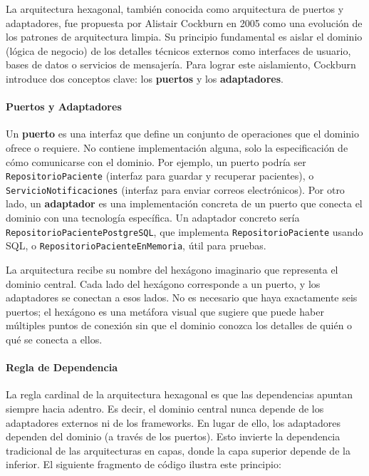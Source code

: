La arquitectura hexagonal, también conocida como arquitectura de puertos y adaptadores, 
fue propuesta por Alistair Cockburn en 2005 como una evolución de los patrones de arquitectura 
limpia\cite{hexagonalCockburn}. Su principio fundamental es aislar el dominio (lógica de negocio) 
de los detalles técnicos externos como interfaces de usuario, bases de datos o servicios 
de mensajería. Para lograr este aislamiento, Cockburn introduce dos conceptos clave: los 
\textbf{puertos} y los \textbf{adaptadores}.

\paragraph{Puertos y Adaptadores}
Un \textbf{puerto} es una interfaz que define un conjunto de operaciones que el dominio 
ofrece o requiere. No contiene implementación alguna, solo la especificación de cómo 
comunicarse con el dominio. Por ejemplo, un puerto podría ser \texttt{RepositorioPaciente} 
(interfaz para guardar y recuperar pacientes), o \texttt{ServicioNotificaciones} 
(interfaz para enviar correos electrónicos). Por otro lado, un \textbf{adaptador} 
es una implementación concreta de un puerto que conecta el dominio con una tecnología 
específica. Un adaptador concreto sería \texttt{RepositorioPacientePostgreSQL}, 
que implementa \texttt{RepositorioPaciente} usando SQL, o 
\texttt{RepositorioPacienteEnMemoria}, útil para pruebas.

La arquitectura recibe su nombre del hexágono imaginario que representa el dominio central.
Cada lado del hexágono corresponde a un puerto, y los adaptadores se conectan a esos lados. 
No es necesario que haya exactamente seis puertos; el hexágono es una metáfora visual que 
sugiere que puede haber múltiples puntos de conexión sin que el dominio conozca los detalles 
de quién o qué se conecta a ellos\cite{hexagonalExplained}.

\paragraph{Regla de Dependencia}
La regla cardinal de la arquitectura hexagonal es que las dependencias apuntan siempre hacia 
adentro. Es decir, el dominio central nunca depende de los adaptadores externos ni de los 
frameworks. En lugar de ello, los adaptadores dependen del dominio (a través de los puertos). 
Esto invierte la dependencia tradicional de las arquitecturas en capas, donde la capa superior 
depende de la inferior. El siguiente fragmento de código ilustra este principio:

